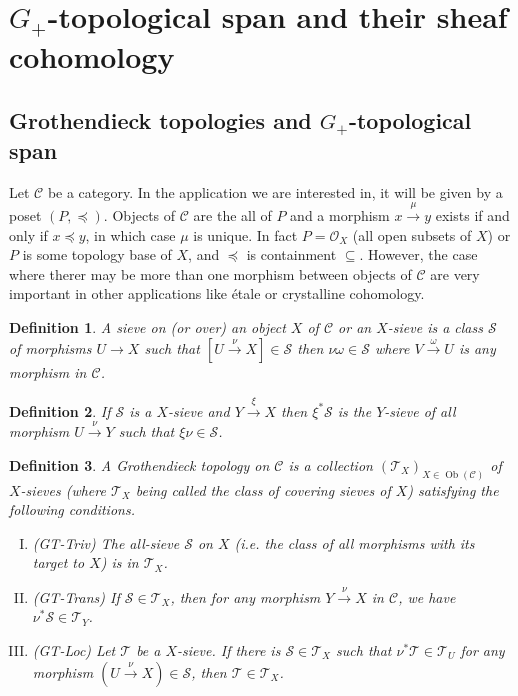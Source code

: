 \documentclass[8pt]{article}
\numberwithin{equation}{section}
\newtheorem{definition}{Definition}[subsection]
\newtheorem{remark}{Remark}[subsection]
\DeclareMathOperator{\Ob}{Ob}
\newcommand{\Ouv}{\mathscr{O}}
\newcommand{\sC}[0]{\mathscr{C}}
\newcommand{\sS}[0]{\mathscr{S}}
\begin{document}

\section{$G_+$-topological span and their sheaf cohomology}
\subsection{Grothendieck topologies and $G_+$-topological span}
Let $\sC$ be a category. In the application we are interested in, it will be given by a poset $(P,\preceq)$. Objects of $\sC$ are the all of $P$ and a morphism $x\stackrel{\mu}{\to}y$ exists if and only if $x\preceq y$, in which case $\mu$ is unique. In fact $P=\Ouv_X$ (all open subsets of $X$) or $P$ is some topology base of $X$, and $\preceq$ is containment $\subseteq$. However, the case where therer may be more than one morphism between objects of $\sC$ are very important in other applications like étale or crystalline cohomology.
\begin{definition}
    \label{definition_8_1}
    A sieve on (or over) an object $X$ of $\sC$ or an $X$-sieve is a class $\mathscr{S}$ of morphisms $U\to X$ such that $[U\stackrel{\nu}{\to}X]\in\mathscr{S}$ then $\nu\omega\in\mathscr{S}$ where $V\stackrel{\omega}{\to}U$ is any morphism in $\sC$.
\end{definition}
\begin{definition}
    \label{definition_8_1_1}
    If $\sS$ is a $X$-sieve and $Y\stackrel{\xi}{\to}X$ then $\xi^*\sS$ is the $Y$-sieve of all morphism $U\stackrel{\nu}{\to}Y$ such that $\xi\nu\in\sS$.
\end{definition}
\begin{definition}
    \label{definition_8_2}
    A Grothendieck topology on $\sC$ is a collection $(\mathcal{T}_X)_{X\in\Ob(\sC)}$ of $X$-sieves (where $\mathcal{T}_X$ being called the class of covering sieves of $X$) satisfying the following conditions.
    \begin{enumerate}[I.]
        \item (GT-Triv) The all-sieve $\sS$ on $X$ (i.e. the class of all morphisms with its target to $X$) is in $\mathcal{T}_X$.
        \item (GT-Trans) If $\sS\in\mathcal{T}_X$, then for any morphism $Y\stackrel{\nu}{\to}X$ in $\sC$, we have $ \nu^*\sS\in\mathcal{T}_Y$.
        \item (GT-Loc) Let $\mathscr{T}$ be a $X$-sieve. If there is $\sS\in\mathcal{T}_X$ such that $\nu^*\mathscr{T}\in\mathcal{T}_U$ for any morphism $(U\stackrel{\nu}{\to}X)\in\sS$, then $\mathscr{T}\in\mathcal{T}_X$.
    \end{enumerate}
\end{definition}
\end{document}
